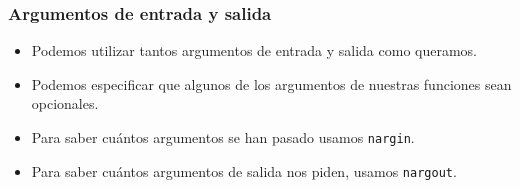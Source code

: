 \begin{frame}[label=func_argumentos]
 \frametitle{Argumentos de entrada y salida}
 \begin{itemize}
  \item Podemos utilizar tantos argumentos de entrada y salida como queramos.
  \item Podemos especificar que algunos de los argumentos de nuestras funciones
    sean opcionales.
  \item Para saber cuántos argumentos se han pasado usamos   
    \alert{\texttt{nargin}}.
  \item Para saber cuántos argumentos de salida nos piden, usamos
    \alert{\texttt{nargout}}.
 \end{itemize}
\end{frame}
